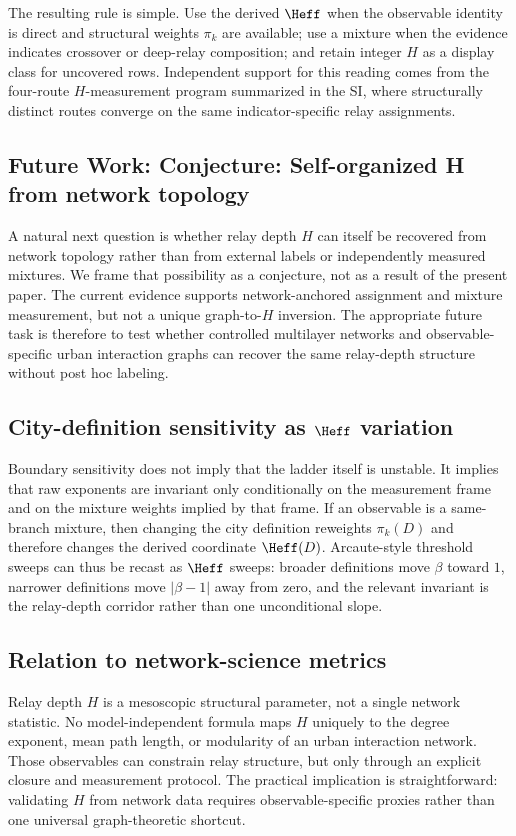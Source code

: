 The resulting rule is simple. Use the derived $\Heff$ when the
observable identity is direct and structural weights $\pi_k$ are available; use a
mixture when the evidence indicates crossover or deep-relay composition; and
retain integer $H$ as a display class for uncovered rows. Independent support
for this reading comes from the four-route $H$-measurement program summarized
in the SI, where structurally distinct routes converge on the same
indicator-specific relay assignments.

\subsection{Future Work: Conjecture: Self-organized H from network topology}
\label{subsec:H_selforg_conjecture}
A natural next question is whether relay depth $H$ can itself be recovered
from network topology rather than from external labels or independently measured
mixtures. We frame that possibility as a conjecture, not as a result of the
present paper. The current evidence supports network-anchored assignment and
mixture measurement, but not a unique graph-to-$H$ inversion. The appropriate
future task is therefore to test whether controlled multilayer networks and
observable-specific urban interaction graphs can recover the same relay-depth
structure without post hoc labeling.

\subsection{City-definition sensitivity as \(\Heff\) variation}
Boundary sensitivity does not imply that the ladder itself is unstable. It
implies that raw exponents are invariant only conditionally on the measurement
frame and on the mixture weights implied by that frame. If an observable is a
same-branch mixture, then changing the city definition reweights $\pi_k(D)$
and therefore changes the derived coordinate $\Heff(D)$. Arcaute-style
threshold sweeps can thus be recast as $\Heff$ sweeps: broader definitions
move $\beta$ toward $1$, narrower definitions move $|\beta-1|$ away from
zero, and the relevant invariant is the relay-depth corridor rather than one
unconditional slope.

\subsection{Relation to network-science metrics}
Relay depth $H$ is a mesoscopic structural parameter, not a single network
statistic. No model-independent formula maps $H$ uniquely to the degree
exponent, mean path length, or modularity of an urban interaction network.
Those observables can constrain relay structure, but only through an explicit
closure and measurement protocol. The practical implication is straightforward:
validating $H$ from network data requires observable-specific proxies rather
than one universal graph-theoretic shortcut.

